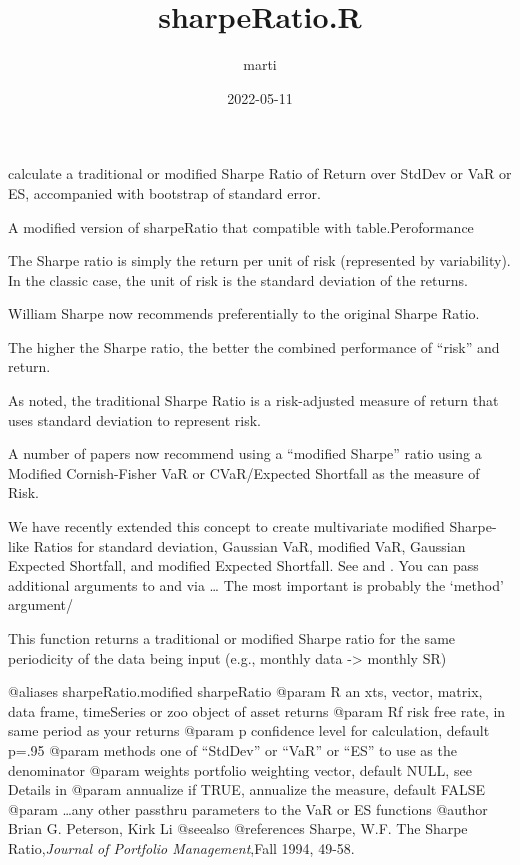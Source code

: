 \documentclass[
]{article}
\title{sharpeRatio.R}
\author{marti}
\date{2022-05-11}
\begin{document}
\maketitle

calculate a traditional or modified Sharpe Ratio of Return over StdDev
or VaR or ES, accompanied with bootstrap of standard error.

A modified version of sharpeRatio that compatible with
table.Peroformance

The Sharpe ratio is simply the return per unit of risk (represented by
variability). In the classic case, the unit of risk is the standard
deviation of the returns.


William Sharpe now recommends 
preferentially to the original Sharpe Ratio.

The higher the Sharpe ratio, the better the combined performance of
``risk'' and return.

As noted, the traditional Sharpe Ratio is a risk-adjusted measure of
return that uses standard deviation to represent risk.

A number of papers now recommend using a ``modified Sharpe'' ratio using
a Modified Cornish-Fisher VaR or CVaR/Expected Shortfall as the measure
of Risk.

We have recently extended this concept to create multivariate modified
Sharpe-like Ratios for standard deviation, Gaussian VaR, modified VaR,
Gaussian Expected Shortfall, and modified Expected Shortfall. See
 and . You can pass additional
arguments to  and  via \dots{} The most
important is probably the `method' argument/

This function returns a traditional or modified Sharpe ratio for the
same periodicity of the data being input (e.g., monthly data
-\textgreater{} monthly SR)

@aliases sharpeRatio.modified sharpeRatio @param R an xts, vector,
matrix, data frame, timeSeries or zoo object of asset returns @param Rf
risk free rate, in same period as your returns @param p confidence level
for calculation, default p=.95 @param methods one of ``StdDev'' or
``VaR'' or ``ES'' to use as the denominator @param weights portfolio
weighting vector, default NULL, see Details in  @param
annualize if TRUE, annualize the measure, default FALSE @param \dots any
other passthru parameters to the VaR or ES functions @author Brian G.
Peterson, Kirk Li @seealso  \cr
{} \cr {} \cr
{} \cr {} \cr
{} \cr {} \cr @references Sharpe, W.F. The
Sharpe Ratio,\emph{Journal of Portfolio
Management},Fall 1994, 49-58.
\end{document}
